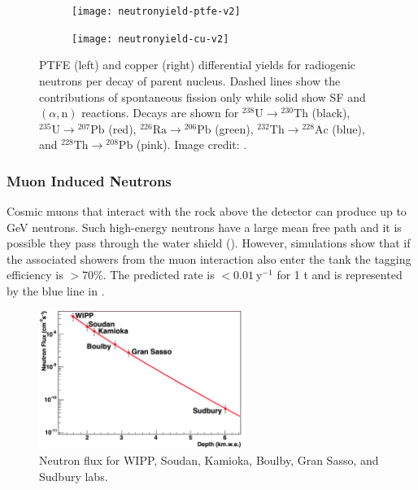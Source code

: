 \begin{figure}
    \centering
    \begin{subfigure}[t]{0.5\textwidth}
        \centering
        \texttt{[image: neutronyield-ptfe-v2]}
    \end{subfigure}%
    \begin{subfigure}[t]{0.5\textwidth}
        \centering
        \texttt{[image: neutronyield-cu-v2]}
    \end{subfigure}
    \caption{PTFE (left) and copper (right) differential yields for radiogenic neutrons per decay of parent nucleus.  Dashed lines show
    the contributions of spontaneous fission only while solid show SF and $(\alpha, \mathrm{n})$ reactions.  Decays are shown
    for $\mathrm{^{238}U} \rightarrow \mathrm{^{230}Th}$ (black), $\mathrm{^{235}U} \rightarrow \mathrm{^{207}Pb}$ (red),
    $\mathrm{^{226}Ra} \rightarrow \mathrm{^{206}Pb}$ (green), $\mathrm{^{232}Th} \rightarrow \mathrm{^{228}Ac}$ (blue), and
    $\mathrm{^{228}Th} \rightarrow \mathrm{^{208}Pb}$ (pink).  Image credit: .}
	\label{fig:backgrounds_nuclear_radiogenic_rates}
\end{figure}



\subsubsection{Muon Induced Neutrons}
\label{subsubsec:backgrounds_nuclear_muon_induced}
Cosmic muons that interact with the rock above the detector can produce up to GeV neutrons.  Such high-energy neutrons have a large mean
free path and it is possible they pass through the water shield ().  However, simulations show that
if the associated showers from the muon interaction also enter the tank the tagging efficiency is $> 70\%$.  The predicted rate is
$< 0.01\ \mathrm{y^{-1}}$ for 1 t and is represented by the blue line in .

\begin{figure}
\centering
\includegraphics[width=0.6\textwidth]{MuonFluxOverDepth}
\caption{Neutron flux for WIPP, Soudan, Kamioka, Boulby, Gran Sasso, and Sudbury labs.}
\label{fig:backgrounds_nuclear_muon_induced_flux}
\end{figure}

